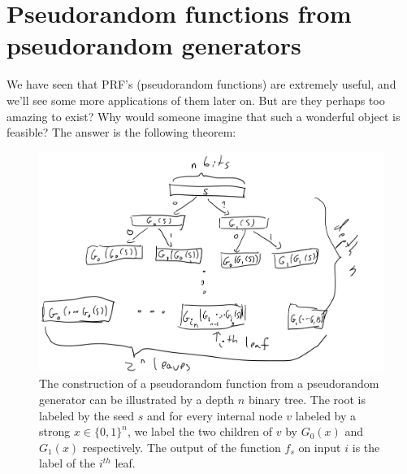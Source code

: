 \chapter{Pseudorandom functions from pseudorandom
generators}\label{Pseudorandom-functions-fr}

We have seen that PRF's (pseudorandom functions) are extremely useful,
and we'll see some more applications of them later on. But are they
perhaps too amazing to exist? Why would someone imagine that such a
wonderful object is feasible? The answer is the following theorem:

\hypertarget{prfthm}{}


\begin{figure}
\centering
\includegraphics[width=\textwidth, height=0.25\paperheight, keepaspectratio]{../figure/prf-const.jpg}
\caption{The construction of a pseudorandom function from a pseudorandom
generator can be illustrated by a depth \(n\) binary tree. The root is
labeled by the seed \(s\) and for every internal node \(v\) labeled by a
strong \(x\in\{0,1\}^n\), we label the two children of \(v\) by
\(G_0(x)\) and \(G_1(x)\) respectively. The output of the function
\(f_s\) on input \(i\) is the label of the \(i^{th}\) leaf.}
\label{PRFfromPRGfig}
\end{figure}


